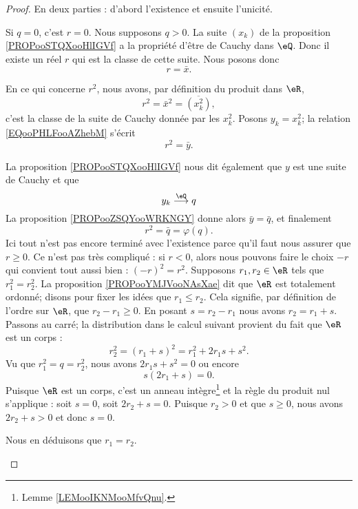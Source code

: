 \begin{proof}
	En deux parties : d'abord l'existence et ensuite l'unicité.
	\begin{subproof}
		\spitem[Existence]
		Si \( q=0\), c'est \( r=0\). Nous supposons \( q>0\). La suite \( (x_k)\) de la proposition \ref{PROPooSTQXooHlIGVf} a la propriété d'être de Cauchy dans \( \eQ\). Donc il existe un réel \( r\) qui est la classe de cette suite. Nous posons donc
		\begin{equation}
			r=\bar x.
		\end{equation}

		En ce qui concerne \( r^2\), nous avons, par définition du produit dans \( \eR\),
		\begin{equation}        \label{EQooPHLFooAZhebM}
			r^2=\bar x^2=\overline{ (x_k^2) },
		\end{equation}
		c'est la classe de la suite de Cauchy donnée par les \( x_k^2\). Posons \( y_k=x_k^2\); la relation \eqref{EQooPHLFooAZhebM} s'écrit
		\begin{equation}
			r^2=\bar y.
		\end{equation}

		La proposition \ref{PROPooSTQXooHlIGVf} nous dit également que \( y\) est une suite de Cauchy et que
		\begin{equation}
			y_k\stackrel{\eQ}{\longrightarrow}q
		\end{equation}
		La proposition \ref{PROPooZSQYooWRKNGY} donne alors \( \bar y=\bar q\), et finalement
		\begin{equation}
			r^2=\bar q=\varphi(q).
		\end{equation}
		Ici tout n'est pas encore terminé avec l'existence parce qu'il faut nous assurer que \( r\geq 0\). Ce n'est pas très compliqué : si \( r<0\), alors nous pouvons faire le choix \( -r\) qui convient tout aussi bien : \( (-r)^2=r^2\).
		\spitem[Unicité]
		Supposons \( r_1,r_2\in \eR\) tels que \( r_1^2=r_2^2\). La proposition \ref{PROPooYMJVooNAsXae} dit que \( \eR\) est totalement ordonné; disons pour fixer les idées que \( r_1\leq r_2\). Cela signifie, par définition de l'ordre sur \( \eR\), que \( r_2-r_1\geq 0\). En posant \( s=r_2-r_1\) nous avons \( r_2=r_1+s\). Passons au carré; la distribution dans le calcul suivant provient du fait que \( \eR\) est un corps :
		\begin{equation}
			r_2^2=(r_1+s)^2=r_1^2+2r_1s+s^2.
		\end{equation}
		Vu que \( r_1^2=q=r_2^2\), nous avons \( 2r_1s+s^2=0\) ou encore
		\begin{equation}
			s(2r_1+s)=0.
		\end{equation}
		Puisque \( \eR\) est un corps, c'est un anneau intègre\footnote{Lemme \ref{LEMooIKNMooMfvQnu}.} et la règle du produit nul s'applique : soit \( s=0\), soit \( 2r_2+s=0\). Puisque \( r_2>0\) et que \( s\geq 0\), nous avons \( 2r_2+s>0\) et donc \( s=0\).

		Nous en déduisons que \( r_1=r_2\).
	\end{subproof}
\end{proof}


